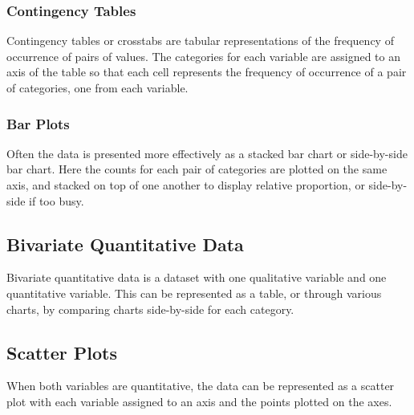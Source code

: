 \documentclass{article}
\begin{document}
\subsubsection{Contingency Tables}
Contingency tables or crosstabs are tabular representations of the frequency of occurrence of pairs of values.
The categories for each variable are assigned to an axis of the table so that each cell
represents the frequency of occurrence of a pair of categories, one from each variable.
\subsubsection{Bar Plots}
Often the data is presented more effectively as a stacked bar chart or side-by-side bar chart.
Here the counts for each pair of categories are plotted on the same axis, and
stacked on top of one another to display relative proportion, or side-by-side if
too busy.
\subsection{Bivariate Quantitative Data}
Bivariate quantitative data is a dataset with one qualitative variable and one quantitative variable.
This can be represented as a table, or through various charts, by comparing charts side-by-side for each category.
\subsection{Scatter Plots}
When both variables are quantitative, the data can be represented as a scatter plot with
each variable assigned to an axis and the points plotted on the axes.
\end{document}
